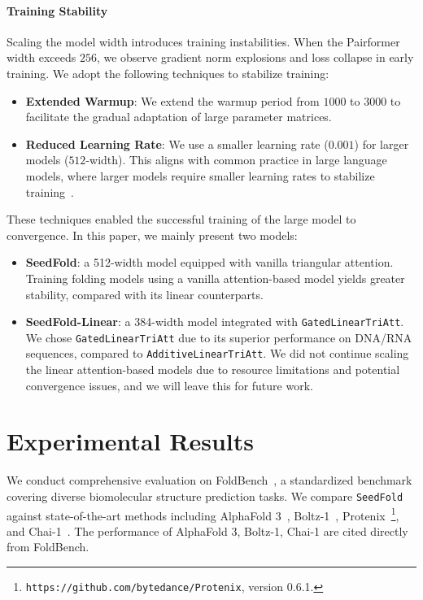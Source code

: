 \documentclass[]{bytedance_seed}
\begin{document}
\paragraph{Training Stability}
Scaling the model width introduces training instabilities. When the Pairformer width exceeds $256$, we observe gradient norm explosions and loss collapse in early training. We adopt the following techniques to stabilize training:

\begin{itemize}
    \item \textbf{Extended Warmup}: We extend the warmup period from $1000$ to $3000$ to facilitate the gradual adaptation of large parameter matrices.
    \item \textbf{Reduced Learning Rate}: We use a smaller learning rate ($0.001$) for larger models ($512$-width). This aligns with common practice in large language models, where larger models require smaller learning rates to stabilize training~\cite{touvron2023llama}.
\end{itemize}

These techniques enabled the successful training of the large model to convergence. In this paper, we mainly present two models: 

\begin{itemize}
    \item \textbf{SeedFold}: a 512-width model equipped with vanilla triangular attention. Training folding models using a vanilla attention-based model yields greater stability, compared with its linear counterparts.
    \item \textbf{SeedFold-Linear}: a 384-width model integrated with \texttt{GatedLinearTriAtt}. We chose \texttt{GatedLinearTriAtt} due to its superior performance on DNA/RNA sequences, compared to \texttt{AdditiveLinearTriAtt}. We did not continue scaling the linear attention-based models due to resource limitations and potential convergence issues, and we will leave this for future work.
\end{itemize}


\section{Experimental Results}
\label{sec:main_results}

We conduct comprehensive evaluation on FoldBench~\cite{xu2025benchmarking}, a standardized benchmark covering diverse biomolecular structure prediction tasks. We compare \texttt{SeedFold} against state-of-the-art methods including AlphaFold 3~\cite{abramson2024accurate}, Boltz-1~\cite{wohlwend2025boltz}, Protenix~\cite{bytedance2025protenix}\footnote{\texttt{https://github.com/bytedance/Protenix}, version 0.6.1.}, and Chai-1~\cite{chai2024chai}. The performance of AlphaFold 3, Boltz-1, Chai-1 are cited directly from FoldBench. 
\end{document}
